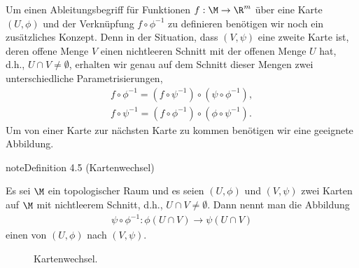 \documentclass[letterpaper,10pt,german]{jupyterBook}
\let\sphinxpxdimen\pdfpxdimen\else\newdimen\sphinxpxdimen
\begin{document}
\sphinxAtStartPar
Um einen Ableitungsbegriff für Funktionen \(f:\M\to\R^m\) über eine Karte \((U,\phi)\) und der Verknüpfung \(f\circ \phi^{-1}\) zu definieren benötigen wir noch ein zusätzliches Konzept.
Denn in der Situation, dass \((V,\psi)\) eine zweite Karte ist, deren offene Menge \(V\) einen nichtleeren Schnitt mit der offenen Menge \(U\) hat, d.h., \(U\cap V \neq \emptyset\), erhalten wir genau auf dem Schnitt dieser Mengen zwei unterschiedliche Parametrisierungen,
\begin{equation*}
\begin{split}f\circ \phi^{-1} = (f\circ\psi^{-1})\circ(\psi\circ \phi^{-1}),\\
f\circ \psi^{-1} = (f\circ\phi^{-1})\circ(\phi\circ \psi^{-1}).\end{split}
\end{equation*}
\sphinxAtStartPar
Um von einer Karte zur nächsten Karte zu kommen benötigen wir eine geeignete Abbildung.
\label{manifolds/manifolds_prelim:definition-7}
\begin{sphinxadmonition}{note}{Definition 4.5 (Kartenwechsel)}



\sphinxAtStartPar
Es sei \(\M\) ein topologischer Raum und es seien \((U,\phi)\) und \((V,\psi)\) zwei Karten auf \(\M\) mit nicht\sphinxhyphen{}leerem Schnitt, d.h., \(U\cap V\neq \emptyset\).
Dann nennt man die Abbildung
\begin{equation*}
\begin{split}\psi\circ\phi^{-1}: \phi(U\cap V)\rightarrow \psi(U\cap V)\end{split}
\end{equation*}
\sphinxAtStartPar
einen  von \((U,\phi)\) nach \((V,\psi)\).
\end{sphinxadmonition}

\begin{figure}[htbp]
\centering
\capstart

\noindent\sphinxincludegraphics[height=450\sphinxpxdimen]{{chartchange}.jpg}
\caption{Kartenwechsel.}\label{\detokenize{manifolds/manifolds_prelim:fig-chartchange}}\end{figure}
\end{document}
